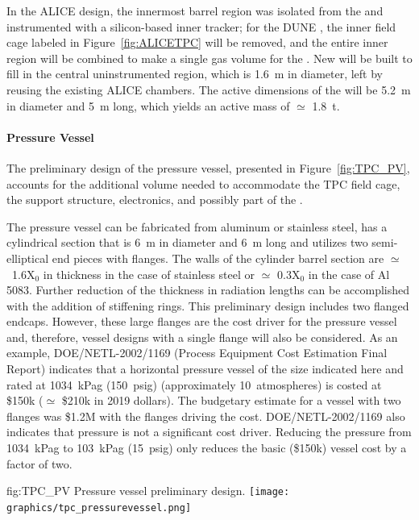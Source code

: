 In the ALICE design, the innermost barrel region was isolated from the  and instrumented with a silicon-based inner tracker; for the DUNE , the inner field cage labeled in Figure~\ref{fig:ALICETPC} will be removed, and the entire inner region will be combined to make a single gas volume for the . New  will be built to fill in the central uninstrumented region, which is \SI{1.6}{m} in diameter, left by reusing the existing ALICE chambers.  The active dimensions of the  will be \SI{5.2}{m} in diameter and \SI{5}{m} long, which yields an active mass of $\simeq$ \SI{1.8}{t}. 


\paragraph{ Pressure Vessel}\label{sec:TPC_PV}

The preliminary design of the pressure vessel, presented in Figure~\ref{fig:TPC_PV}, accounts for the additional volume needed to accommodate the TPC field cage, the  support structure,  electronics, and possibly part of the .

The pressure vessel can be fabricated from aluminum or stainless steel, has a cylindrical section that is 6~m in diameter and \SI{6}{m} long and utilizes two semi-elliptical end pieces with flanges. The walls of the cylinder barrel section are $\simeq$~1.6X$_0$ in thickness in the case of stainless steel or $\simeq$ 0.3X$_0$ in the case of Al 5083.  Further reduction of the thickness in radiation lengths can be accomplished  with the addition of stiffening rings.   This preliminary design includes two flanged endcaps.  However, these large flanges are the cost driver for the pressure vessel and, therefore, vessel designs with a single flange will also be considered.  As an example, DOE/NETL-2002/1169 (Process Equipment Cost Estimation
Final Report) indicates that a horizontal pressure vessel of the size indicated here and rated at \SI{1034}{kPag} (\SI{150}{psig}) (approximately 10~atmospheres) is costed at \$150k ($\simeq$ \$210k in 2019 dollars).  The budgetary estimate for a vessel with two flanges was \$1.2M with the flanges driving the cost.  DOE/NETL-2002/1169 also indicates that pressure is not a significant cost driver.  Reducing the pressure from \SI{1034}{kPag} to \SI{103}{kPag} (\SI{15}{psig}) only reduces the basic (\$150k) vessel cost by a factor of two.

\begin{dunefigure}{fig:TPC_PV}
{Pressure vessel preliminary design.}
\texttt{[image: graphics/tpc\_pressurevessel.png]}
\end{dunefigure}

